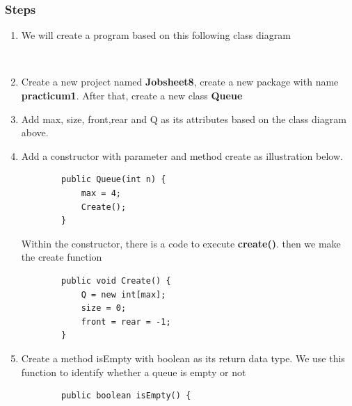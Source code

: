 \documentclass[12pt,titlepage]{article}
\begin{document}
\subsubsection{Steps}
\begin{enumerate}
    \item We will create a program based on this following class diagram
    \mbox{}\\
    \mbox{}\\
    \item Create a new project named \textbf{Jobsheet8}, create a new package with name \textbf{practicum1}. After that, create a new class \textbf{Queue}
    \item Add max, size, front,rear and Q as its attributes based on the class diagram above.
    \item Add a constructor with parameter and method create as illustration below.
    \begin{verbatim}
        public Queue(int n) {
            max = 4;
            Create();
        }
    \end{verbatim}
    Within the constructor, there is a code to execute \textbf{create()}. then we make the create function
    \begin{verbatim}
        public void Create() {
            Q = new int[max];
            size = 0;
            front = rear = -1;
        }
    \end{verbatim}
    \item Create a method isEmpty with boolean as its return data type. We use this function to identify whether a queue is empty or not
    \begin{verbatim}
        public boolean isEmpty() {

\end{verbatim}
\end{enumerate}
\end{document}
